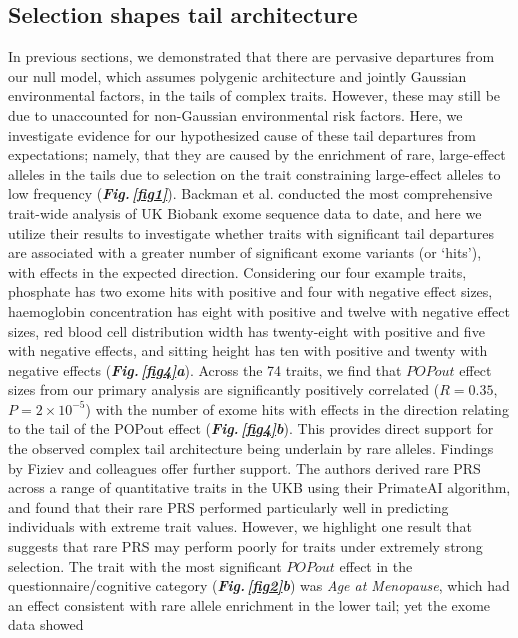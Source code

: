 \documentclass[12pt]{zHenriquesLab-StyleBioRxiv}
\newcommand\fref[1]{\normalsize{\textbf{\textit{Fig.\,\ref{#1}}}}\normalsize{}}
\newcommand\dref[2]{\normalsize{\textbf{\textit{Fig.\,\ref{#1}#2}}}\normalsize{}}
\begin{document}
\subsection*{Selection shapes tail architecture}
In previous sections, we demonstrated that there are 
pervasive departures from our null model, which assumes 
polygenic architecture and jointly Gaussian environmental 
factors, in the tails of complex traits. However, these 
may still be due to unaccounted for non-Gaussian environmental 
risk factors. Here, we investigate evidence for our 
hypothesized cause of these tail departures from expectations; 
namely, that they are caused by the enrichment of rare, 
large-effect alleles in the tails due to selection on the 
trait constraining large-effect alleles to low frequency 
(\fref{fig1}). Backman et al. \cite{Backman2021} conducted 
the most comprehensive trait-wide analysis of UK Biobank 
exome sequence data to date, and here we utilize their 
results to investigate whether traits with significant tail 
departures are associated with a greater number of significant 
exome variants (or ‘hits’), with effects in the expected 
direction. Considering our four example traits, phosphate has
two exome hits with positive and four with negative 
effect sizes, haemoglobin concentration has eight with 
positive and twelve with negative effect sizes, red blood 
cell distribution width has twenty-eight with positive and 
five with negative effects, and sitting height has ten with 
positive and twenty with negative effects (\dref{fig4}{a}). 
Across the 74 traits, we find that $POPout$ effect sizes from 
our primary analysis are significantly positively 
correlated ($R=0.35$, $P=2\times10^{-5}$) with the 
number of exome hits with effects in the direction 
relating to the tail of the POPout 
effect (\dref{fig4}{b}). This provides direct 
support for the observed complex tail architecture 
being underlain by rare alleles. Findings by Fiziev and 
colleagues \cite{Fiziev2023} offer further support. 
The authors derived rare PRS across a range of quantitative 
traits in the UKB using their PrimateAI algorithm, and 
found that their rare PRS performed particularly well in 
predicting individuals with extreme trait values. 
However, we highlight one result that suggests that rare 
PRS may perform poorly for traits under extremely strong 
selection. The trait with the most significant $POPout$ 
effect in the questionnaire/cognitive category 
(\dref{fig2}{b}) was \textit{Age at Menopause}, 
which had an effect consistent with rare allele 
enrichment in the lower tail; yet the exome data showed 
\end{document}
